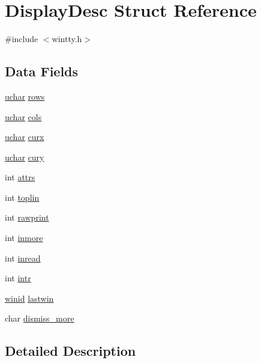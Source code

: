 \hypertarget{structDisplayDesc}{\section{Display\+Desc Struct Reference}
\label{structDisplayDesc}
}


{\ttfamily \#include $<$wintty.\+h$>$}

\subsection*{Data Fields}
\begin{DoxyCompactItemize}
\item 
\hyperlink{config_8h_a65f85814a8290f9797005d3b28e7e5fc}{uchar} \hyperlink{structDisplayDesc_a55f38c5cab97073d98b99b816be778bf}{rows}
\item 
\hyperlink{config_8h_a65f85814a8290f9797005d3b28e7e5fc}{uchar} \hyperlink{structDisplayDesc_ab39648e3369fe48107300cdc04f66a4b}{cols}
\item 
\hyperlink{config_8h_a65f85814a8290f9797005d3b28e7e5fc}{uchar} \hyperlink{structDisplayDesc_a8c612d7cc16ceb505542221371392e34}{curx}
\item 
\hyperlink{config_8h_a65f85814a8290f9797005d3b28e7e5fc}{uchar} \hyperlink{structDisplayDesc_ad5f7059d70f6aec54ca124dfc178a75b}{cury}
\item 
int \hyperlink{structDisplayDesc_a572f46f1d3d2c38e0f8b4f98d89146a8}{attrs}
\item 
int \hyperlink{structDisplayDesc_a42ca3d6db2bb7800d91936e30bdfacd7}{toplin}
\item 
int \hyperlink{structDisplayDesc_af4dc2f4161cf6554cc281ddc1d329025}{rawprint}
\item 
int \hyperlink{structDisplayDesc_a81baf7dfae73fa9721aa673039be3880}{inmore}
\item 
int \hyperlink{structDisplayDesc_aea74f9fa5f0342ec323f8e330ce7f1e6}{inread}
\item 
int \hyperlink{structDisplayDesc_a4511fe2ae3e15fd9175772d266167f92}{intr}
\item 
\hyperlink{wintype_8h_adc2de956a3f084b1691cf080e1d1412b}{winid} \hyperlink{structDisplayDesc_aacade99c7de23ebd3c3417024a005848}{lastwin}
\item 
char \hyperlink{structDisplayDesc_acb184f2bc093e0c8b9436b469d2ffaf0}{dismiss\+\_\+more}
\end{DoxyCompactItemize}


\subsection{Detailed Description}


